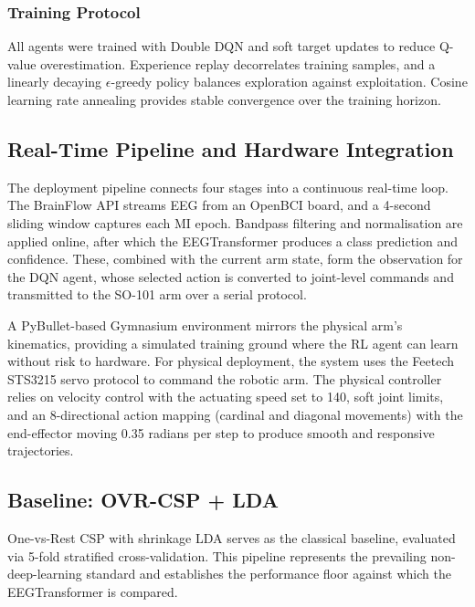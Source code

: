 \documentclass[12pt, a4paper]{article}
\begin{document}
\subsubsection{Training Protocol}

All agents were trained with Double DQN and soft target updates to reduce Q-value overestimation. Experience replay decorrelates training samples, and a linearly decaying $\epsilon$-greedy policy balances exploration against exploitation. Cosine learning rate annealing provides stable convergence over the training horizon.

\subsection{Real-Time Pipeline and Hardware Integration}

The deployment pipeline connects four stages into a continuous real-time loop. The BrainFlow API streams EEG from an OpenBCI board, and a 4-second sliding window captures each MI epoch. Bandpass filtering and normalisation are applied online, after which the EEGTransformer produces a class prediction and confidence. These, combined with the current arm state, form the observation for the DQN agent, whose selected action is converted to joint-level commands and transmitted to the SO-101 arm over a serial protocol.

A PyBullet-based Gymnasium environment mirrors the physical arm's kinematics, providing a simulated training ground where the RL agent can learn without risk to hardware. For physical deployment, the system uses the Feetech STS3215 servo protocol to command the robotic arm. The physical controller relies on velocity control with the actuating speed set to 140, soft joint limits, and an 8-directional action mapping (cardinal and diagonal movements) with the end-effector moving 0.35 radians per step to produce smooth and responsive trajectories.

\subsection{Baseline: OVR-CSP + LDA}

One-vs-Rest CSP with shrinkage LDA serves as the classical baseline, evaluated via 5-fold stratified cross-validation. This pipeline represents the prevailing non-deep-learning standard and establishes the performance floor against which the EEGTransformer is compared.
\end{document}
